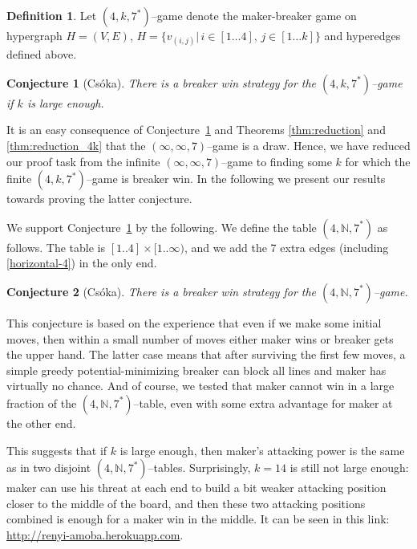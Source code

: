 \documentclass[conference]{IEEEtran}
\newtheorem{conjecture}{Conjecture}[section]
\theoremstyle{definition}
\newtheorem{definition}{Definition}[section]
\begin{document}
\begin{definition}
Let $(4,k,7^*)$--game denote the maker-breaker game on hypergraph $H=(V,E)$, $H=\{ v_{(i,j)} | \, i\in [1 \dots 4],\, j \in [1 \dots k] \}$ and hyperedges defined above.
\end{definition}


\begin{conjecture}[Cs\'oka]
\label{thm:csoka}
There is a breaker win strategy for the $(4,k,7^*)$--game if $k$ is large enough. 
\end{conjecture}

It is an easy consequence of Conjecture~\ref{thm:csoka} and Theorems \ref{thm:reduction} and \ref{thm:reduction_4k} that the $(\infty,\infty,7)$--game is a draw. Hence, we have reduced our proof task from the infinite $(\infty,\infty,7)$--game to finding some $k$ for which the finite $(4,k,7^*)$--game is breaker win. In the following we present our results towards proving the latter conjecture.

We support Conjecture~\ref{thm:csoka} by the following. We define the table $(4, \mathbb{N}, 7^*)$ as follows. The table is $[1..4] \times [1..\infty)$, and we add the 7 extra edges (including \eqref{horizontal-4}) in the only end.

\begin{conjecture}[Cs\'oka]
\label{thm:csoka2}
There is a breaker win strategy for the $(4, \mathbb{N}, 7^*)$--game. 
\end{conjecture}

This conjecture is based on the experience that even if we make some initial moves, then within a small number of moves either maker wins or breaker gets the upper hand. The latter case means that after surviving the first few moves, a simple greedy potential-minimizing breaker can block all lines and maker has virtually no chance. And of course, we tested that maker cannot win in a large fraction of the $(4, \mathbb{N}, 7^*)$--table, even with some extra advantage for maker at the other end.

This suggests that if $k$ is large enough, then maker's attacking power is the same as in two disjoint $(4, \mathbb{N}, 7^*)$--tables. Surprisingly, $k =  14$ is still not large enough: maker can use his threat at each end to build a bit weaker attacking position closer to the middle of the board, and then these two attacking positions combined is enough for a maker win in the middle. It can be seen in this link: \url{http://renyi-amoba.herokuapp.com}.
\end{document}
